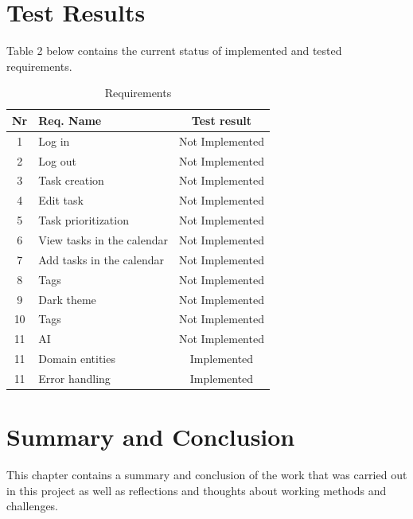 \documentclass{article}
\begin{document}
\clearpage
\section{Test Results}
Table 2 below contains the current status of implemented and tested requirements.

\begin{table}[H]
  \centering
  \begin{tabularx}{\textwidth}{|c|X|c|}
    \toprule
    \textbf{Nr} & \textbf{Req. Name}         & \textbf{Test result} \\
    \hline
    1           & Log in                     & Not Implemented      \\    \hline
    2           & Log out                    & Not Implemented      \\    \hline
    3           & Task creation              & Not Implemented      \\ \hline
    4           & Edit task                  & Not Implemented      \\    \hline
    5           & Task prioritization        & Not Implemented      \\    \hline
    6           & View tasks in the calendar & Not Implemented      \\    \hline
    7           & Add tasks in the calendar  & Not Implemented      \\    \hline
    8           & Tags                       & Not Implemented      \\ \hline
    9           & Dark theme                 & Not Implemented      \\    \hline
    10          & Tags                       & Not Implemented      \\\hline
    11          & AI                         & Not Implemented      \\\hline
    11          & Domain entities            & Implemented          \\\hline
    11          & Error handling             & Implemented          \\
    \bottomrule
  \end{tabularx}
  \caption{Requirements}
  \label{results}
\end{table}

\section{Summary and Conclusion}
This chapter contains a summary and conclusion of the work that was carried out in this project as well as reflections and thoughts about working methods and challenges.
\end{document}
